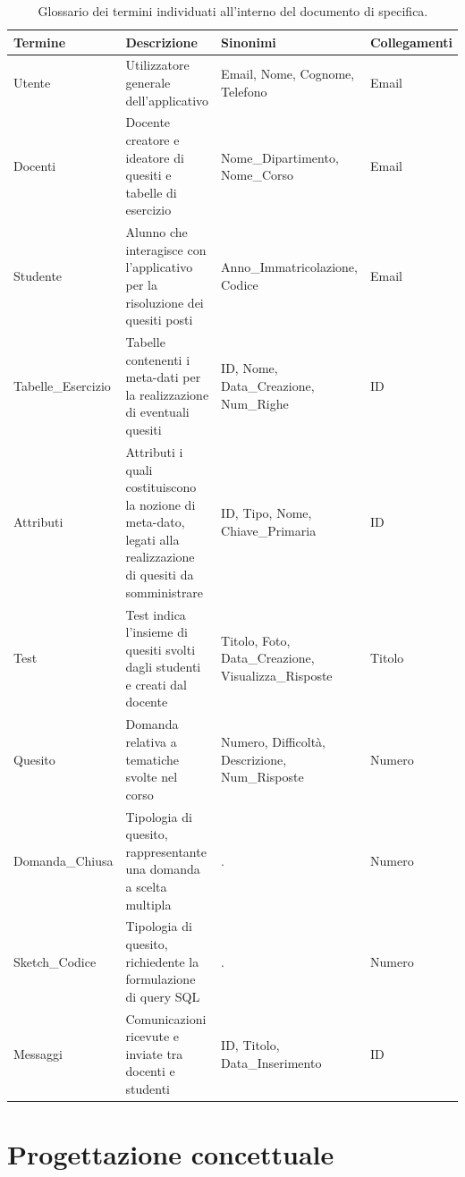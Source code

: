 \documentclass{article}
\begin{document}
\begin{table}[H]
    \centering
    \begin{tabularx}{\textwidth}{|X|p{6.5cm}|X|X|}
        \hline
        \bf Termine & \bf Descrizione & \bf Sinonimi & \bf Collegamenti \\
        \hline
        Utente & Utilizzatore generale dell'applicativo & Email, Nome, Cognome, Telefono & Email \\        
        \hline
        Docenti & Docente creatore e ideatore di quesiti e tabelle di esercizio & Nome\_Dipartimento, Nome\_Corso & Email \\
        \hline
        Studente & Alunno che interagisce con l'applicativo per la risoluzione dei quesiti posti & Anno\_Immatricolazione, Codice & Email \\
        \hline
        Tabelle\_Esercizio & Tabelle contenenti i meta-dati per la realizzazione di eventuali quesiti & ID, Nome, Data\_Creazione, Num\_Righe & ID \\
        \hline
        Attributi & Attributi i quali costituiscono la nozione di meta-dato, legati alla realizzazione di quesiti da somministrare & ID, Tipo, Nome, Chiave\_Primaria & ID \\
        \hline
        Test & Test indica l'insieme di quesiti svolti dagli studenti e creati dal docente & Titolo, Foto, Data\_Creazione, Visualizza\_Risposte & Titolo \\
        \hline
        Quesito & Domanda relativa a tematiche svolte nel corso & Numero, Difficoltà, Descrizione, Num\_Risposte & Numero \\
        \hline
        Domanda\_Chiusa & Tipologia di quesito, rappresentante una domanda a scelta multipla & . & Numero \\
        \hline
        Sketch\_Codice & Tipologia di quesito, richiedente la formulazione di query SQL & . & Numero \\
        \hline
        Messaggi & Comunicazioni ricevute e inviate tra docenti e studenti & ID, Titolo, Data\_Inserimento & ID \\
        \hline
    \end{tabularx}
    \caption{Glossario dei termini individuati all'interno del documento di specifica.}
\end{table}

\section{Progettazione concettuale}
\large
\end{document}
